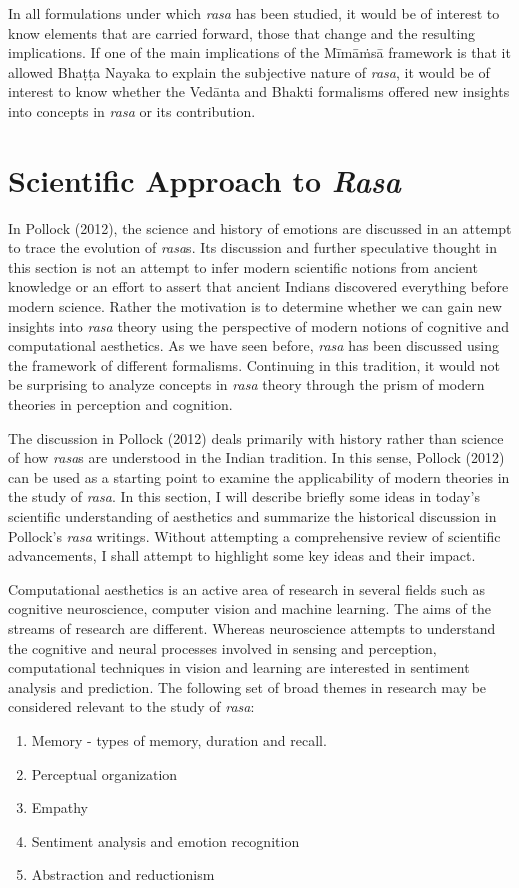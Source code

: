 In all formulations under which \textsl{rasa} has been studied, it would be of interest to know elements that are carried forward, those that change and the resulting implications. If one of the main implications of the Mīmāṁsā framework is that it allowed Bhaṭṭa Nayaka to explain the subjective nature of \textsl{rasa}, it would be of interest to know whether the Vedānta and Bhakti formalisms offered new insights into concepts in \textsl{rasa} or its contribution. 

\section*{Scientific Approach to \textsl{Rasa}}

In Pollock (2012), the science and history of emotions are discussed in an attempt to trace the evolution of \textsl{rasa}s. Its discussion and further speculative thought in this section is not an attempt to infer modern scientific notions from ancient knowledge or an effort to assert that ancient Indians discovered everything before modern science. Rather the motivation is to determine whether we can gain new insights into \textsl{rasa} theory using the perspective of modern notions of cognitive and computational aesthetics. As we have seen before, \textsl{rasa} has been discussed using the framework of different formalisms. Continuing in this tradition, it would not be surprising to analyze concepts in \textsl{rasa} theory through the prism of modern theories in perception and cognition. 

The discussion in Pollock (2012) deals primarily with history rather than science of how \textsl{rasa}s are understood in the Indian tradition. In this sense, Pollock (2012) can be used as a starting point to examine the applicability of modern theories in the study of \textsl{rasa}. In this section, I will describe briefly some ideas in today’s scientific understanding of aesthetics and summarize the historical discussion in Pollock’s \textsl{rasa} writings. Without attempting a comprehensive review of scientific advancements, I shall attempt to highlight some key ideas and their impact. 

Computational aesthetics is an active area of research in several fields such as cognitive neuroscience, computer vision and machine learning. The aims of the streams of research are different. Whereas neuroscience attempts to understand the cognitive and neural processes involved in sensing and perception, computational techniques in vision and learning are interested in sentiment analysis and prediction. The following set of broad themes in research may be considered relevant to the study of \textsl{rasa}:
\begin{enumerate}
\itemsep=1pt
\item Memory - types of memory, duration and recall. 
\item Perceptual organization
\item Empathy
\item Sentiment analysis and emotion recognition
\item Abstraction and reductionism
\end{enumerate}

